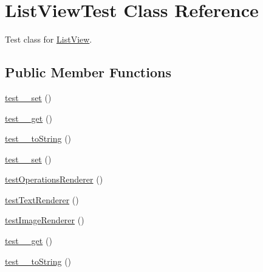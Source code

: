 \hypertarget{class_list_view_test}{
\section{ListViewTest Class Reference}
\label{class_list_view_test}
}


Test class for \hyperlink{class_list_view}{ListView}.  


\subsection*{Public Member Functions}
\begin{DoxyCompactItemize}
\item 
\hyperlink{class_list_view_test_a7c2833d4d3e54dafef1be4bd0df703b5}{test\_\-\_\-set} ()
\item 
\hyperlink{class_list_view_test_aa66b76414526d7fcf38a3afca490388f}{test\_\-\_\-get} ()
\item 
\hyperlink{class_list_view_test_a608254c2d3d1d7a97798392935efbb08}{test\_\-\_\-toString} ()
\item 
\hyperlink{class_list_view_test_a7c2833d4d3e54dafef1be4bd0df703b5}{test\_\-\_\-set} ()
\item 
\hyperlink{class_list_view_test_aa4f6a317e2f262f531386480ad056104}{testOperationsRenderer} ()
\item 
\hyperlink{class_list_view_test_ab4a8ee5b9aedc496bfde82093b7abab0}{testTextRenderer} ()
\item 
\hyperlink{class_list_view_test_a42df1f03d7ff413797ab970a5278bb42}{testImageRenderer} ()
\item 
\hyperlink{class_list_view_test_aa66b76414526d7fcf38a3afca490388f}{test\_\-\_\-get} ()
\item 
\hyperlink{class_list_view_test_a608254c2d3d1d7a97798392935efbb08}{test\_\-\_\-toString} ()
\end{DoxyCompactItemize}
